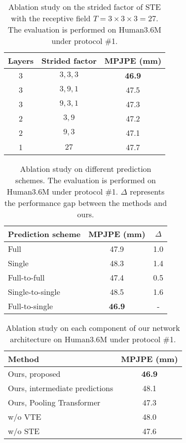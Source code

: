 \documentclass[journal]{IEEEtran}
\begin{document}
\begin{table}[tb]
   \caption
   {
      Ablation study on the strided factor of STE with the receptive field $T = 3 \times 3 \times 3 = 27$. 
      The evaluation is performed on Human3.6M under protocol \#1.
   }
   \centering  
   \setlength{\tabcolsep}{7.50mm} 
   \begin{tabular}{ccc}
   \toprule  [1pt]
   Layers &Strided factor &MPJPE (mm)  \\
   \midrule  [0.5pt]  
   3 &$3, 3, 3$ &\textbf{46.9} \\
   3 &$3, 9, 1$ &47.5  \\
   3 &$9, 3, 1$ &47.3 \\
   2 &$3, 9$ &47.2  \\
   2 &$9, 3$ &47.1  \\
   1 &$27$ &47.7 \\
   \toprule [1pt]
   \end{tabular}
   \label{table:Strided}
\end{table}

\begin{table}[tb]
   \caption
   {
      Ablation study on different prediction schemes. 
      The evaluation is performed on Human3.6M under protocol \#1.
      $\Delta$ represents the performance gap between the methods and ours.
   }
   \centering  
   \setlength{\tabcolsep}{7.30mm} 
   \begin{tabular}{lcc}
   \toprule  [1pt]
   Prediction scheme &MPJPE (mm) &$\Delta$ \\
   \midrule [0.5pt]
   Full &47.9 &1.0 \\
   Single &48.3 &1.4 \\
   Full-to-full &47.4 &0.5 \\
   Single-to-single &48.5 &1.6 \\
   Full-to-single &\textbf{46.9} &- \\
   \toprule [1pt]
   \end{tabular}
   \label{table:prediction}
\end{table}

\begin{table}[!htb]
   \centering
   \caption
   {
      Ablation study on each component of our network architecture on Human3.6M under protocol \#1.
   }
   \setlength{\tabcolsep}{8.35mm} 
   
   \begin{tabular}{lc}
   \toprule [1.0pt] 
   Method& MPJPE (mm) \\
   \midrule [0.5pt] 
   Ours, proposed &\textbf{46.9} \\
   Ours, intermediate predictions &48.1 \\
   Ours, Pooling Transformer &47.3 \\
   \midrule [0.5pt]

   w/o VTE &48.0 \\
   w/o STE &47.6 \\
   \toprule [1.0pt] 
   \end{tabular}
   \label{table:ablation_method}
\end{table}
\end{document}
